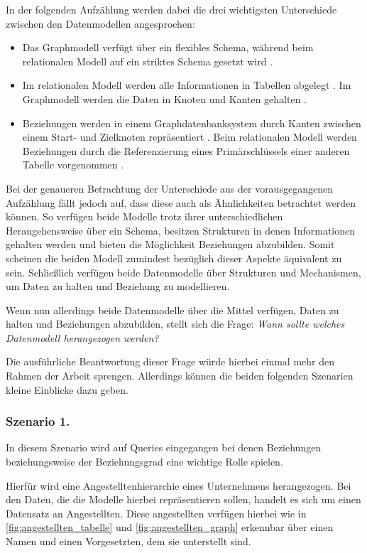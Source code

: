 In der folgenden Aufzählung werden dabei die drei wichtigsten Unterschiede zwischen den Datenmodellen angesprochen:
\begin{itemize}
    \item Das Graphmodell verfügt über ein flexibles Schema, während beim relationalen Modell auf ein striktes Schema gesetzt wird \cite{gdbms,rdbms_book}.
    \item Im relationalen Modell werden alle Informationen in Tabellen abgelegt \cite{rdbms_book}. Im Graphmodell werden die Daten in Knoten und Kanten gehalten \cite{gdbms}. 
    \item Beziehungen werden in einem Graphdatenbanksystem durch Kanten zwischen einem Start- und Zielknoten repräsentiert \cite{gdbms}. Beim relationalen Modell werden Beziehungen durch die Referenzierung eines Primärschlüssels einer anderen Tabelle vorgenommen \cite{rdbms_book}. 
\end{itemize}
Bei der genaueren Betrachtung der Unterschiede aus der vorausgegangenen Aufzählung fällt jedoch auf, dass diese auch als Ähnlichkeiten betrachtet werden können. So verfügen beide Modelle trotz ihrer unterschiedlichen Herangehensweise über ein Schema, besitzen Strukturen in denen Informationen gehalten werden und bieten die Möglichkeit Beziehungen abzubilden. Somit scheinen die beiden Modell zumindest bezüglich dieser Aspekte äquivalent zu sein. Schließlich verfügen beide Datenmodelle über Strukturen und Mechanismen, um Daten zu halten und Beziehung zu modellieren. 

Wenn nun allerdings beide Datenmodelle über die Mittel verfügen, Daten zu halten und Beziehungen abzubilden, stellt sich die Frage: \textit{Wann sollte welches Datenmodell herangezogen werden?}

Die ausführliche Beantwortung dieser Frage würde hierbei einmal mehr den Rahmen der Arbeit sprengen. Allerdings können die beiden folgenden Szenarien kleine Einblicke dazu geben. 

\subsubsection{Szenario 1.}
In diesem Szenario wird auf Queries eingegangen bei denen Beziehungen beziehungsweise der Beziehungsgrad eine wichtige Rolle spielen. 

Hierfür wird eine Angestelltenhierarchie eines Unternehmens herangezogen. Bei den Daten, die die Modelle hierbei repräsentieren sollen, handelt es sich um einen Datensatz an Angestellten. Diese angestellten verfügen hierbei wie in \autoref{fig:angestellten_tabelle} und \autoref{fig:angestellten_graph} erkennbar über einen Namen und einen Vorgesetzten, dem sie unterstellt sind. 


